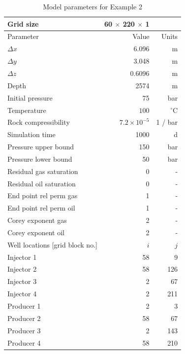 \documentclass[twocolumn,numbook]{svjour3}          %
\begin{document}
\begin{table}
\centering
\caption{Model parameters for Example 2}
\begin{tabular}{|l|rr|}
\hline
Grid size                & 60 $\times$ 220 $\times$ 1 &       \\
\hline\hline
Parameter                & Value    & Units \\
\hline
$\Delta x$               & 6.096&m          \\
$\Delta y$               & 3.048&m          \\
$\Delta z$               & 0.6096&m         \\
Depth                    & 2574&m           \\
Initial pressure         & 75  & bar        \\
Temperature              &$100$ & $^\circ$C     \\
\hline
Rock compressibility     & $7.2 \times 10^{-5}$ & 1 / bar \\
Simulation time          &1000 & d          \\
Pressure upper bound     & 150 & bar        \\
Pressure lower bound     &  50 & bar        \\
\hline
Residual gas saturation  & 0 & -            \\
Residual oil saturation  & 0 & -            \\
End point rel perm gas   & 1 & -            \\
End point rel perm oil   & 1 & -            \\
Corey exponent gas       & 2 & -            \\
Corey exponent oil       & 2 & -            \\
\hline\hline
Well locations [grid block no.] & $i$ & $j$     \\
\hline
Injector 1               &   58&   9   \\
Injector 2               &   58& 126   \\
Injector 3               &    2&  67   \\
Injector 4               &    2& 211   \\
Producer 1               &    2&   3   \\
Producer 2               &   58&  67   \\
Producer 3               &    2& 143   \\
Producer 4               &   58& 210   \\
\hline
\end{tabular}
\label{table:spe10toplayer}
\end{table}
\end{document}

